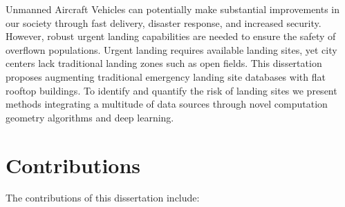 Unmanned Aircraft Vehicles can potentially make substantial improvements in our society through fast delivery, disaster response, and increased security. However, robust urgent landing capabilities are needed to ensure the safety of overflown populations. Urgent landing requires available landing sites, yet city centers lack traditional landing zones such as open fields. This dissertation proposes augmenting traditional emergency landing site databases with flat rooftop buildings. To identify and quantify the risk of landing sites we present methods integrating a multitude of data sources through novel computation geometry algorithms and deep learning. 

\section{Contributions}

The contributions of this dissertation include:

